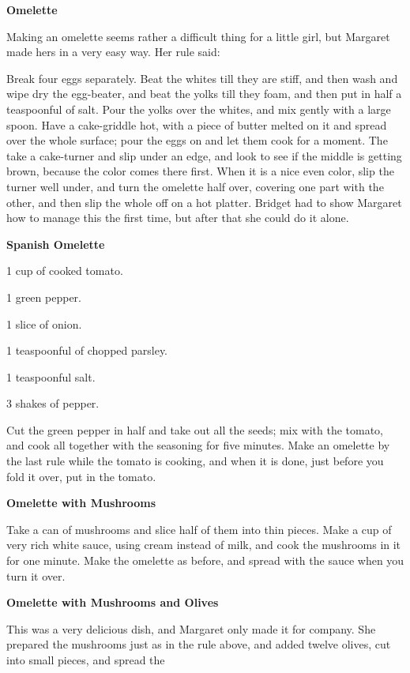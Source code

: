 \documentclass[11pt]{book}
\newcommand{\indpar}{\par\noindent\hspace*{\parindent}}
\newcommand{\ingredient}{\indpar}
\newcommand{\instruction}{\indpar}
\newenvironment{RecipeTitle}{\medskip\begin{center}\large\bf }{\end{center}\smallskip}
\begin{document}
\begin{RecipeTitle}
Omelette\label{omelette}
\end{RecipeTitle}
\instruction
  Making an omelette seems rather a difficult thing for a little girl,
but Margaret made hers in a very easy way.  Her rule said:
\instruction
  Break four eggs separately.  Beat the whites till they are stiff,
and then wash and wipe dry the egg-beater, and beat the yolks till they
foam, and then put in half a teaspoonful of salt.  Pour the yolks over
the whites, and mix gently with a large spoon.  Have a cake-griddle
hot, with a piece of butter melted on it and spread over the whole
surface; pour the eggs on and let them cook for a moment.  The take
a cake-turner and slip under an edge, and look to see if the middle is
getting brown, because the color comes there first.  When it is a nice
even color, slip the turner well under, and turn the omelette half
over, covering one part with the other, and then slip the whole off
on a hot platter.  Bridget had to show Margaret how to manage this
the first time, but after that she could do it alone.
\begin{RecipeTitle}
Spanish Omelette\label{spanish_omelette}
\end{RecipeTitle}
\ingredient  1 cup of cooked tomato.
\ingredient  1 green pepper.
\ingredient  1 slice of onion.
\ingredient  1 teaspoonful of chopped parsley.
\ingredient  1 teaspoonful salt.
\ingredient  3 shakes of pepper.
\instruction
  Cut the green pepper in half and take out all the seeds; mix with
the tomato, and cook all together with the seasoning for five minutes.
Make an omelette by the last rule while the tomato is cooking, and
when it is done, just before you fold it over, put in the tomato.
\begin{RecipeTitle}
Omelette with Mushrooms\label{omelette_with_mushrooms}
\end{RecipeTitle}
\instruction
  Take a can of mushrooms and slice half of them into thin pieces.
Make a cup of very rich white sauce, using cream instead of milk,
and cook the mushrooms in it for one minute.  Make the omelette as
before, and spread with the sauce when you turn it over.
\begin{RecipeTitle}
Omelette with Mushrooms and Olives\label{omelette_with_mushrooms_and_olives}
\end{RecipeTitle}
\instruction
  This was a very delicious dish, and Margaret only made it for
company.  She prepared the mushrooms just as in the rule above,
and added twelve olives, cut into small pieces, and spread the
\end{document}
